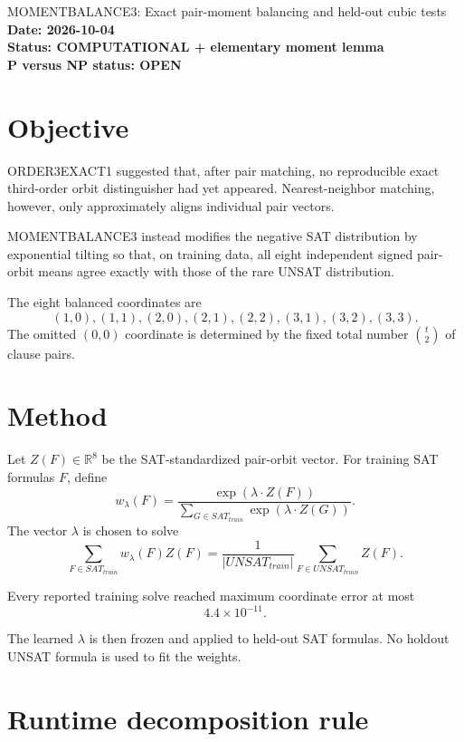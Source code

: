 \documentclass[11pt]{article}
\begin{document}
\begin{center}
{\Large MOMENTBALANCE3: Exact pair-moment balancing and held-out cubic tests}\\[4pt]
\textbf{Date: 2026-10-04}\\
\textbf{Status: COMPUTATIONAL + elementary moment lemma}\\
\textbf{P versus NP status: OPEN}
\end{center}

\section{Objective}

ORDER3EXACT1 suggested that, after pair matching, no reproducible exact
third-order orbit distinguisher had yet appeared.  Nearest-neighbor matching,
however, only approximately aligns individual pair vectors.

MOMENTBALANCE3 instead modifies the negative SAT distribution by exponential
tilting so that, on training data, all eight independent signed pair-orbit
means agree exactly with those of the rare UNSAT distribution.

The eight balanced coordinates are
\[
(1,0),(1,1),(2,0),(2,1),(2,2),(3,1),(3,2),(3,3).
\]
The omitted \((0,0)\) coordinate is determined by the fixed total number
\(\binom t2\) of clause pairs.

\section{Method}

Let \(Z(F)\in\mathbb R^8\) be the SAT-standardized pair-orbit vector.
For training SAT formulas \(F\), define
\[
w_\lambda(F)
=
\frac{\exp(\lambda\cdot Z(F))}
{\sum_{G\in SAT_{train}}\exp(\lambda\cdot Z(G))}.
\]
The vector \(\lambda\) is chosen to solve
\[
\sum_{F\in SAT_{train}}w_\lambda(F)Z(F)
=
\frac1{|UNSAT_{train}|}
\sum_{F\in UNSAT_{train}}Z(F).
\tag{MB}
\]

Every reported training solve reached maximum coordinate error at most
\[
4.4\times10^{-11}.
\]

The learned \(\lambda\) is then frozen and applied to held-out SAT formulas.
No holdout UNSAT formula is used to fit the weights.

\section{Runtime decomposition rule}
\end{document}
